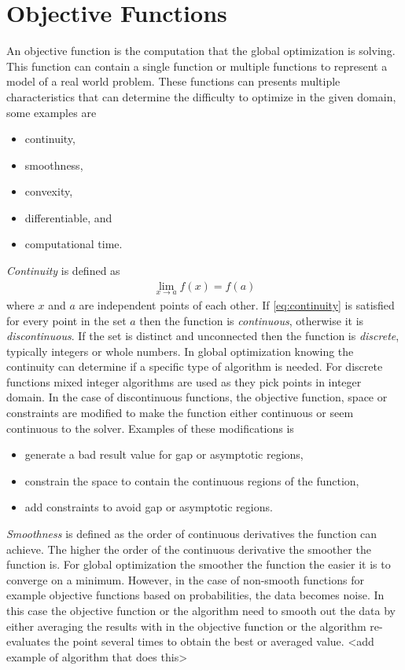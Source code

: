 \section{Objective Functions}
An objective function is the computation that the global optimization is solving. This function can contain a single function or multiple functions to represent a model of a real world problem. These functions can presents multiple characteristics that can determine the difficulty to optimize in the given domain, some examples are
\begin{itemize}
  \item continuity,
  \item smoothness,
  \item convexity,
  \item differentiable, and
  \item computational time.
\end{itemize}
\textit{Continuity} is defined as  
\begin{align}
  \label{eq:continuity}
  \lim_{x\rightarrow a} f(x) = f(a)
\end{align}
where $x$ and $a$ are independent points of each other. If \ref{eq:continuity} is satisfied for every point in the set $a$ then the function is \textit{continuous}, otherwise it is \textit{discontinuous}. If the set is distinct and unconnected then the function is \textit{discrete}, typically integers or whole numbers. In global optimization knowing the continuity can determine if a specific type of algorithm is needed. For discrete functions mixed integer algorithms are used
as they pick points in integer domain. In the case of discontinuous functions, the objective function, space or constraints are modified to make the function either continuous or seem continuous to the solver. Examples of these modifications is
\begin{itemize}
    \item generate a bad result value for gap or asymptotic regions,
    \item constrain the space to contain the continuous regions of the function,
    \item add constraints to avoid gap or asymptotic regions.
\end{itemize}

\textit{Smoothness} is defined as the order of continuous derivatives the function can achieve. The higher the order of the continuous derivative the smoother the function is. For global optimization the smoother the function the easier it is to converge on a minimum. However, in the case of non-smooth functions for example objective functions based on probabilities, the data becomes noise. In this case the objective function or the algorithm need to smooth out the data by either averaging
the results with in the objective function or the algorithm re-evaluates the point several times to obtain the best or averaged value. <add example of algorithm that does this>

